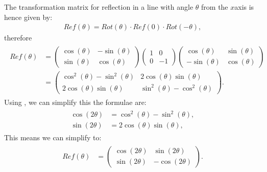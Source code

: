 \documentclass[letterpaper,10pt,english]{jupyterBook}
\begin{document}
\sphinxAtStartPar
The transformation matrix for reflection in a line with angle \(\theta\) from the \(x\)\sphinxhyphen{}axis is hence given by:
\begin{equation*}
\begin{split} Re\!f(\theta) = Rot(\theta) \cdot Re\!f(0) \cdot Rot(-\theta), \end{split}
\end{equation*}
\sphinxAtStartPar
therefore
\begin{equation*}
\begin{split} \begin{align*}
    Re\!f(\theta) &=
    \begin{pmatrix} \cos(\theta) & -\sin(\theta) \\ \sin(\theta) & \cos(\theta) \end{pmatrix}
    \begin{pmatrix} 1 & 0 \\ 0 & -1 \end{pmatrix}
    \begin{pmatrix} \cos(\theta) & \sin(\theta) \\ -\sin(\theta) & \cos(\theta) \end{pmatrix} \\
    &= \begin{pmatrix}
        \cos^2(\theta) - \sin^2(\theta) & 2\cos(\theta)\sin(\theta) \\
        2\cos(\theta)\sin(\theta) & \sin^2(\theta) - \cos^2(\theta)
    \end{pmatrix}.
\end{align*} \end{split}
\end{equation*}
\sphinxAtStartPar
Using , we can simplify this \sphinxhyphen{} the formulae are:
\begin{equation*}
\begin{split} \begin{align*}
    \cos(2\theta) &= \cos^2(\theta) - \sin^2(\theta), \\
    \sin(2\theta) &= 2\cos(\theta) \sin(\theta),
\end{align*} \end{split}
\end{equation*}
\sphinxAtStartPar
This means we can simplify to:
\begin{equation*}
\begin{split} \begin{align*}
    Re\!f(\theta) &=
    \begin{pmatrix}
        \cos(2\theta) & \sin(2\theta) \\
        \sin(2\theta) & -\cos(2\theta)
    \end{pmatrix}.
\end{align*} \end{split}
\end{equation*}\label{_pages/6.3_Rotation_reflection_and_translation:reflection-theorem}
\end{document}
